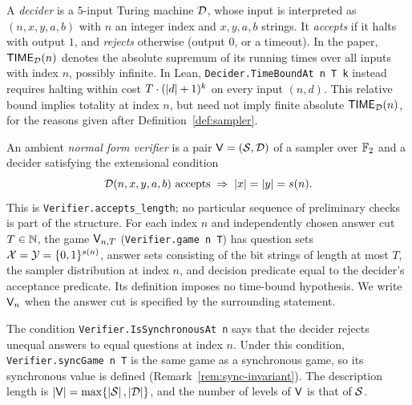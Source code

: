 \begin{definition}[Decider]
\label{def:decider}
\leanok
A \emph{decider} is a $5$-input Turing machine $\mathcal{D}$, whose input is interpreted
as $(n, x, y, a, b)$ with $n$ an integer index and $x, y, a, b$ strings. It \emph{accepts}
if it halts with output $1$, and \emph{rejects} otherwise (output $0$, or a timeout).
In the paper, $\mathsf{TIME}_{\mathcal{D}}(n)$ denotes the absolute supremum of its running times
over all inputs with index $n$, possibly infinite. In Lean,
\texttt{Decider.TimeBoundAt n T k} instead requires halting within cost
$T \cdot (\left\vert {d} \right\vert + 1)^k$ on every input $(n, d)$. This relative bound implies
totality at index $n$, but need not imply finite absolute $\mathsf{TIME}_{\mathcal{D}}(n)$, for the
reasons given after Definition~\ref{def:sampler}.
\end{definition}

\begin{definition}
\label{def:normal-verifier}
\leanok
An ambient \emph{normal form verifier} is a pair $\mathsf{V}=(\mathcal{S},\mathcal{D})$ of
a sampler over $\mathbb{F}_2$ and a decider satisfying the extensional condition
\begin{equation*}
  \mathcal{D}(n,x,y,a,b)\text{ accepts}\;\Rightarrow\;
  \left\vert {x} \right\vert=\left\vert {y} \right\vert=s(n).
\end{equation*}
This is \texttt{Verifier.accepts\_length}; no particular sequence of preliminary checks
is part of the structure. For each index $n$ and independently chosen answer cut
$T\in\mathbb{N}$, the game $\mathsf{V}_{n,T}$ (\texttt{Verifier.game n T}) has question sets
$\mathcal{X}=\mathcal{Y}=\{0,1\}^{s(n)}$, answer sets consisting of the bit strings of length at most
$T$, the sampler distribution at index $n$, and decision predicate equal to the decider's
acceptance predicate. Its definition imposes no time-bound hypothesis. We write
$\mathsf{V}_n$ when the answer cut is specified by the surrounding statement.

The condition \texttt{Verifier.IsSynchronousAt n} says that the decider rejects unequal
answers to equal questions at index $n$. Under this condition,
\texttt{Verifier.syncGame n T} is the same game as a synchronous game, so its synchronous
value is defined (Remark~\ref{rem:sync-invariant}). The description length is
$\left\vert {\mathsf{V}} \right\vert = \max\{\left\vert {\mathcal{S}} \right\vert, \left\vert {\mathcal{D}} \right\vert\}$, and the number of levels of
$\mathsf{V}$ is that of $\mathcal{S}$.
\end{definition}

